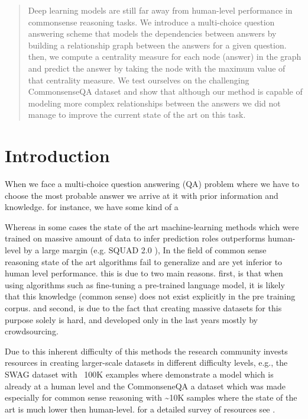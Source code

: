 \documentclass{article}
\begin{document}
\begin{abstract}
Deep learning models are still far away from human-level performance in commonsense reasoning tasks.
We introduce a multi-choice question answering scheme that models the dependencies between answers by
building a relationship graph between the answers for a given question. 
then, we compute a centrality measure for each node (answer) in the graph and predict the answer by taking the node with the maximum value of that centrality measure.
We test ourselves on the challenging CommonsenseQA dataset and show that although our method is capable of modeling more complex relationships between the answers we did not manage to improve the current state of the art on this task.
\end{abstract}

\section{Introduction}
When we face a multi-choice question answering (QA) problem where we have to choose the most 
probable answer we arrive at it with prior information and knowledge. for instance, we have some kind of a

Whereas in some cases the state of the art machine-learning methods which were trained on massive amount of data to infer prediction roles
outperforms human-level by a large margin (e.g. SQUAD 2.0 \cite{rajpurkar2018know}),
In the field of common sense reasoning  \cite{talmor2018commonsenseqa} state of the art algorithms fail to generalize and are yet inferior to human level performance.
this is due to two main reasons. first, is that when using algorithms such as fine-tuning a pre-trained language model, it is likely that this knowledge (common sense) does not exist explicitly in the pre training corpus. and second, is due to the fact that creating massive datasets for this purpose solely is hard, and developed only in the last years mostly by crowdsourcing.

Due to this inherent difficulty of this methods the research community invests resources in creating larger-scale datasets in different difficulty levels, e.g., the SWAG \cite{zellers2018swag} dataset with ~100K examples where \cite{devlin2018bert} demonstrate a model which is already at a human level and the CommonseneQA \cite{talmor2018commonsenseqa} a dataset which was made especially for common sense reasoning with \~{}10K samples where the state of the art is much lower then human-level. for a detailed survey of resources see \cite{storks2019commonsense}. 
\end{document}
